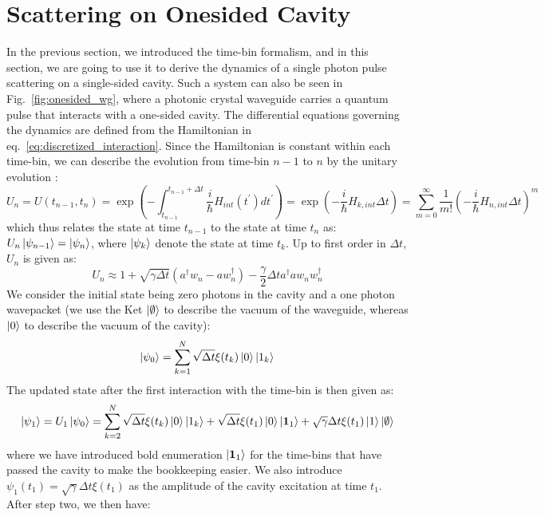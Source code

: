 \section{Scattering on Onesided Cavity \label{sec:onephoton_scat}}
In the previous section, we introduced the time-bin formalism, and in this section, we are going to use it to derive the dynamics of a single photon pulse scattering on a single-sided cavity. Such a system can also be seen in Fig.~\ref{fig:onesided_wg}, where a photonic crystal waveguide carries a quantum pulse that interacts with a one-sided cavity. The differential equations governing the dynamics are defined from the Hamiltonian in eq.~\ref{eq:discretized_interaction}. Since the Hamiltonian is constant within each time-bin, we can describe the evolution from time-bin $n-1$ to $n$ by the unitary evolution \cite{Heuck2020Photon-photonCavities}:
\begin{equation}
    U_n = U(t_{n-1},t_{n}) = \exp \left(- \int_{t_{n-1}}^{t_{n-1}+\Delta t} \frac{i}{\hbar} H_{int}(t^{\prime}) d t^{\prime} \right)  =\exp \left(-\frac{i}{\hbar} H_{k,int} \Delta t\right)=\sum_{m=0}^{\infty} \frac{1}{m !}\left(-\frac{i}{\hbar} H_{n,int} \Delta t\right)^m
\end{equation}
which thus relates the state at time $t_{n-1}$ to the state at time $t_n$ as: $U_n \ket{\psi_{n-1}} = \ket{\psi_n}$, where $\ket{\psi_k}$ denote the state at time $t_k$. Up to first order in $\Delta t$, $U_n$ is given as:
\begin{equation}
    U_n \approx 1+\sqrt{\gamma \Delta t}\left(a^{\dagger} w_n-a w_n^{\dagger}\right)-\frac{\gamma}{2} \Delta t a^{\dagger} a w_n w_n^{\dagger} \label{eq:unitaryevolution}
\end{equation}
We consider the initial state being zero photons in the cavity and a one photon wavepacket (we use the Ket $\ket{\emptyset}$ to describe the vacuum of the waveguide, whereas $\ket{0}$ to describe the vacuum of the cavity):
\begin{equation}
    \left|\psi_0\right\rangle = \sum_{k=1}^N \sqrt{\Delta t} \xi(t_k) \ket{0} \ket{1_k} \label{eq:initial_single}
\end{equation}
The updated state after the first interaction with the time-bin is then given as:
\begin{equation}
    \ket{\psi_1} = U_1 \ket{\psi_0} = \sum_{k=2}^N \sqrt{\Delta t} \xi(t_k) \ket{0} \ket{1_k} + \sqrt{\Delta t} \xi(t_1) \ket{0} \ket{\mathbf{1}_1} + \sqrt{\gamma}  \Delta t \xi(t_1) \ket{1}\ket{\emptyset}
\end{equation}
where we have introduced bold enumeration $\ket{\mathbf{1}_1}$ for the time-bins that have passed the cavity to make the bookkeeping easier. We also introduce $\psi_1(t_1) =\sqrt{\gamma}  \Delta t \xi(t_1)$ as the amplitude of the cavity excitation at time $t_1$. After step two, we then have:

